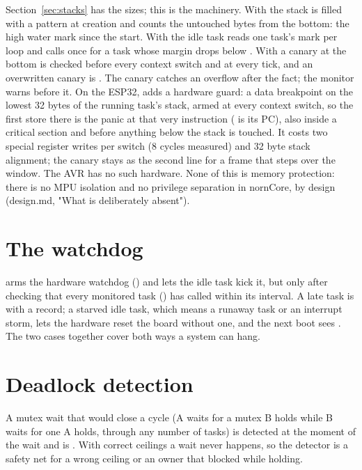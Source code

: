 Section~\ref{sec:stacks} has the sizes; this is the machinery. With
 the stack is filled with a pattern at creation and
 counts the untouched bytes from the bottom: the high water
mark since the start. With  the idle task reads one task's
mark per loop and calls  once for a task whose margin drops
below . With  a canary at the bottom
is checked before every context switch and at every tick, and an overwritten canary is
. The canary catches an overflow after the fact; the
monitor warns before it. On the ESP32,  adds a hardware
guard: a data breakpoint on the lowest 32 bytes of the running task's stack, armed at
every context switch, so the first store there is the panic at that very instruction
( is its PC), also inside a critical section and before anything below the
stack is touched. It costs two special register writes per switch (8 cycles measured)
and 32 byte stack alignment; the canary stays as the second line for a frame that steps
over the window. The AVR has no such hardware. None of this is memory protection: there
is no MPU isolation and no privilege separation in nornCore, by design (design.md,
"What is deliberately absent").

\section{The watchdog}

 arms the hardware watchdog () and lets the
idle task kick it, but only after checking that every monitored task
() has called  within its interval. A late
task is  with a record; a starved idle task, which means a
runaway task or an interrupt storm, lets the hardware reset the board without one, and
the next boot sees . The two cases together cover both ways
a system can hang.

\section{Deadlock detection}

A mutex wait that would close a cycle (A waits for a mutex B holds while B waits for one
A holds, through any number of tasks) is detected at the moment of the wait and is
. With correct ceilings a wait never happens, so the detector
is a safety net for a wrong ceiling or an owner that blocked while holding.

